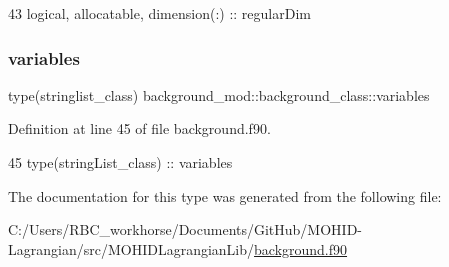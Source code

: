 \begin{DoxyCode}
43         \textcolor{keywordtype}{logical}, \textcolor{keywordtype}{allocatable}, \textcolor{keywordtype}{dimension(:)} :: regularDim
\end{DoxyCode}
\mbox{\label{structbackground__mod_1_1background__class_af6524c71d9bc6c9b4226fe6e362f04fd}} 
\subsubsection{\texorpdfstring{variables}{variables}}
{\footnotesize\ttfamily type(stringlist\+\_\+class) background\+\_\+mod\+::background\+\_\+class\+::variables\hspace{0.3cm}{\ttfamily [private]}}



Definition at line 45 of file background.\+f90.


\begin{DoxyCode}
45         \textcolor{keywordtype}{type}(stringList\_class) :: variables
\end{DoxyCode}


The documentation for this type was generated from the following file\+:\begin{DoxyCompactItemize}
\item 
C\+:/\+Users/\+R\+B\+C\+\_\+workhorse/\+Documents/\+Git\+Hub/\+M\+O\+H\+I\+D-\/\+Lagrangian/src/\+M\+O\+H\+I\+D\+Lagrangian\+Lib/\mbox{\hyperlink{background_8f90}{background.\+f90}}\end{DoxyCompactItemize}
